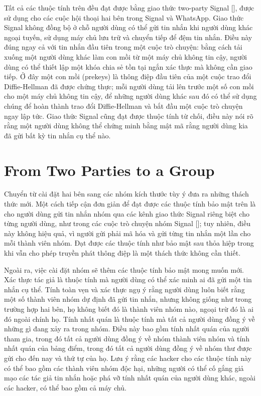 \documentclass[../main-report.tex]{subfiles}
\begin{document}
Tất cả các thuộc tính trên đều đạt được bằng giao thức two-party Signal [\cite{14,15}], được sử dụng cho các cuộc hội thoại hai bên trong Signal và WhatsApp. Giao thức Signal không đồng bộ ở chỗ người dùng có thể gửi tin nhắn khi người dùng khác ngoại tuyến, sử dụng máy chủ lưu trữ và chuyển tiếp để đệm tin nhắn. Điều này đúng ngay cả với tin nhắn đầu tiên trong một cuộc trò chuyện: bằng cách tải xuống một người dùng khác làm con mồi từ một máy chủ không tin cậy, người dùng có thể thiết lập một khóa chia sẻ tồn tại ngắn xác thực mà không cần giao tiếp. Ở đây một con mồi (prekeys) là thông điệp đầu tiên của một cuộc trao đổi Diffie-Hellman đã được chứng thực; mỗi người dùng tải lên trước một số con mồi cho một máy chủ không tin cậy, để những người dùng khác sau đó có thể sử dụng chúng để hoàn thành trao đổi Diffie-Hellman và bắt đầu một cuộc trò chuyện ngay lập tức. Giao thức Signal cũng đạt được thuộc tính từ chối, điều này nói rõ rằng một người dùng không thể chứng minh bằng mật mã rằng người dùng kia đã gửi bất kỳ tin nhắn cụ thể nào.


\section{From Two Parties to a Group}

Chuyển từ cài đặt hai bên sang các nhóm kích thước tùy ý đưa ra những thách thức mới. Một cách tiếp cận đơn giản để đạt được các thuộc tính bảo mật trên là cho người dùng gửi tin nhắn nhóm qua các kênh giao thức Signal riêng biệt cho từng người dùng, như trong các cuộc trò chuyện nhóm Signal [\cite{16}]; tuy nhiên, điều này không hiệu quả, vì người gửi phải mã hóa và gửi từng tin nhắn một lần cho mỗi thành viên nhóm. Đạt được các thuộc tính như bảo mật sau thỏa hiệp trong khi vẫn cho phép truyền phát thông điệp là một thách thức không cần thiết.

Ngoài ra, việc cài đặt nhóm sẽ thêm các thuộc tính bảo mật mong muốn mới. Xác thực tác giả là thuộc tính mà người dùng có thể xác minh ai đã gửi một tin nhắn cụ thể. Tính toàn vẹn và xác thực ngụ ý rằng người dùng luôn biết rằng một số thành viên nhóm dự định đã gửi tin nhắn, nhưng không giống như trong trường hợp hai bên, họ không biết đó là thành viên nhóm nào, ngoại trừ đó là ai đó ngoài chính họ. Tính nhất quán là thuộc tính mà tất cả người dùng đồng ý về những gì đang xảy ra trong nhóm. Điều này bao gồm tính nhất quán của người tham gia, trong đó tất cả người dùng đồng ý về nhóm thành viên nhóm và tính nhất quán của bảng điểm, trong đó tất cả người dùng đồng ý về nhóm thư được gửi cho đến nay và thứ tự của họ. Lưu ý rằng các hacker cho các thuộc tính này có thể bao gồm các thành viên nhóm độc hại, những người có thể cố gắng giả mạo các tác giả tin nhắn hoặc phá vỡ tính nhất quán của người dùng khác, ngoài các hacker, có thể bao gồm cả máy chủ.
\end{document}
